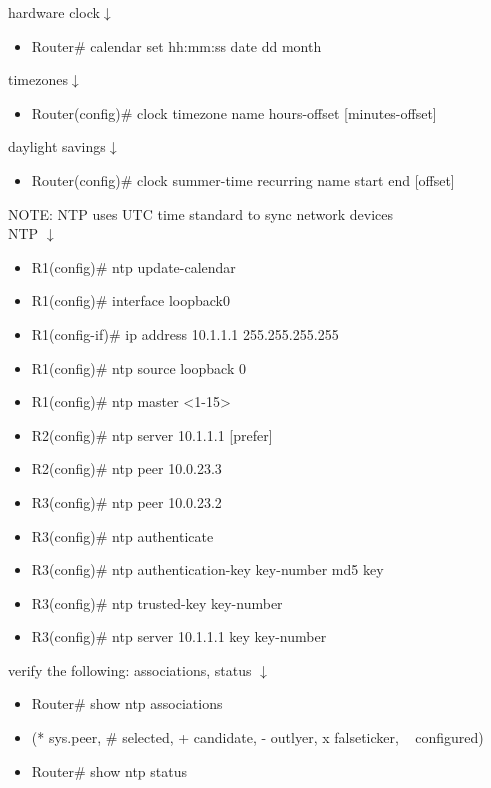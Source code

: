 \documentclass{article}
\begin{document}
hardware clock$\downarrow$
\begin{itemize}
\item Router\# calendar set hh:mm:ss date dd month
\end{itemize}
		
timezones$\downarrow$
\begin{itemize}
\item Router(config)\# clock timezone name hours-offset [minutes-offset]
\end{itemize}
		
daylight savings$\downarrow$
\begin{itemize}
\item Router(config)\# clock summer-time recurring name start end [offset]
\end{itemize}
		
NOTE: NTP uses UTC time standard to sync network devices\\

NTP $\downarrow$
\begin{itemize}
\item R1(config)\# ntp update-calendar
\item R1(config)\# interface loopback0
\item R1(config-if)\# ip address 10.1.1.1 255.255.255.255
\item R1(config)\# ntp source loopback 0
\item R1(config)\# ntp master \textless 1-15\textgreater
\item R2(config)\# ntp server 10.1.1.1 [prefer]
\item R2(config)\# ntp peer 10.0.23.3
\item R3(config)\# ntp peer 10.0.23.2
\item R3(config)\# ntp authenticate
\item R3(config)\# ntp authentication-key key-number md5 key
\item R3(config)\# ntp trusted-key key-number
\item R3(config)\# ntp server 10.1.1.1 key key-number
\end{itemize}

verify the following: associations, status $\downarrow$
\begin{itemize}
\item Router\# show ntp associations
\item (* sys.peer, \# selected, + candidate, - outlyer, x falseticker, ~ configured)
\item Router\# show ntp status
\end{itemize}
		
\end{document}
